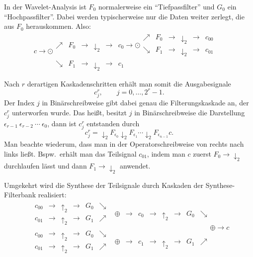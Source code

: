 In der Wavelet-Analysis ist $ F_{0} $ normalerweise ein \enquote{Tiefpassfilter} und $ G_{0} $ ein 
\enquote{Hochpassfilter}. Dabei werden typischerweise nur die Daten weiter zerlegt, die aus $ F_{0} 
$ herauskommen. Also:
\[
  c \rightarrow \odot
  \begin{array}{*{7}{l}}
    \nearrow & \boxed{F_{0}} & \rightarrow & \boxed{\downarrow_{2}} & \rightarrow & 
      c_{0} \rightarrow \odot
      \begin{array}{*{6}{c}}
        \nearrow & \boxed{F_{0}} & \rightarrow & \boxed{\downarrow_{2}} & \rightarrow & c_{00}
          \\[0.5em]
        \searrow & \boxed{F_{1}} & \rightarrow & \boxed{\downarrow_{2}} & \rightarrow & c_{01}
      \end{array} \\
    \searrow & \boxed{F_{1}} & \rightarrow & \boxed{\downarrow_{2}} & \rightarrow & c_{1} &
  \end{array}
\]

Nach $ r $ derartigen Kaskadenschritten erhält man somit die Ausgabesignale
\[
  c_{j}^{r}, \qquad j = 0, \ldots, 2^{r} - 1.
\]
Der Index $ j $ in Binärschreibweise gibt dabei genau die Filterungskaskade an, der $ c_{j}^{r} $
unterworfen wurde. Das heißt, besitzt $ j $ in Binärschreibweise die Darstellung
$ \epsilon_{r-1} \ \epsilon_{r-2} \ \cdots \ \epsilon_{0} $, dann ist $ c_{j}^{r} $ entstanden
durch
\[
  c_{j}^{r} = \downarrow_{2} F_{\epsilon_{0}} \downarrow_{2} F_{\epsilon_{1}} \cdots
              \downarrow_{2} F_{\epsilon_{n-1}}c.
\]
Man beachte wiederum, dass man in der Operatorschreibweise von rechts nach links ließt. Bspw.\ 
erhält man das Teilsignal $ c_{01} $, indem man $ c $ zuerst $ \boxed{F_{0}} \rightarrow 
\boxed{\downarrow_{2}} $ durchlaufen lässt und dann $ \boxed{F_{1}} \rightarrow 
\boxed{\downarrow_{2}} $ anwendet.

Umgekehrt wird die Synthese der Teilsignale durch Kaskaden der Synthese-Filterbank realisiert:
\[
  \begin{array}{*{9}{c}}
    \begin{array}{*{6}{c}}
      c_{00} & \rightarrow & \boxed{\uparrow_{2}} & \rightarrow & \boxed{G_{0}} & \searrow \\[0.5em]
      c_{01} & \rightarrow & \boxed{\uparrow_{2}} & \rightarrow & \boxed{G_{1}} & \nearrow 
    \end{array} 
      & \oplus & \rightarrow & c_{0} & \rightarrow & \boxed{\uparrow_{2}} & \rightarrow 
      & \boxed{G_{0}} & \searrow
      \\[1.5em]
    \begin{array}{*{6}{c}}
      c_{00} & \rightarrow & \boxed{\uparrow_{2}} & \rightarrow & \boxed{G_{0}} & \searrow \\[0.5em]
      c_{01} & \rightarrow & \boxed{\uparrow_{2}} & \rightarrow & \boxed{G_{1}} & \nearrow 
    \end{array}
      & \oplus & \rightarrow & c_{1} & \rightarrow & \boxed{\uparrow_{2}} & \rightarrow 
      & \boxed{G_{1}} & \nearrow
  \end{array}
  \oplus \rightarrow c
\]

